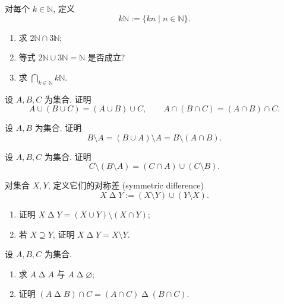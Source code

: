 \documentclass[usesamecnt, thmcnt=section, lang=cn, newtx, 10pt, scheme=chinese]{elegantbook}
\begin{document}
\begin{exercise}\label{ex:sets-02}
对每个 $k\in\mathbb N$, 定义
\[
 k\mathbb N:=\{kn\mid n\in\mathbb N\}.
\]
\begin{enumerate}[label=\rm(\arabic*)]
  \item 求 $2\mathbb N\cap3\mathbb N$;
  \item 等式 $2\mathbb N\cup3\mathbb N=\mathbb N$ 是否成立?
  \item 求 $\bigcap_{k\in\mathbb N}k\mathbb N$.
\end{enumerate}
\end{exercise}

\begin{exercise}\label{ex:sets-06}
设 $A,B,C$ 为集合. 证明
\[
 A\cup(B\cup C)=(A\cup B)\cup C,
 \qquad
 A\cap(B\cap C)=(A\cap B)\cap C.
\]
\end{exercise}

\begin{exercise}\label{ex:sets-09}
设 $A,B$ 为集合. 证明
\[
 B\setminus A=(B\cup A)\setminus A=B\setminus(A\cap B).
\]
\end{exercise}

\begin{exercise}\label{ex:sets-10}
设 $A,B,C$ 为集合. 证明
\[
 C\setminus(B\setminus A)=(C\cap A)\cup(C\setminus B).
\]
\end{exercise}

\begin{exercise}\label{ex:sets-11}
对集合 $X,Y$, 定义它们的{\color{blue}对称差 (symmetric difference)}
\[
 X\mathbin\Delta Y:=(X\setminus Y)\cup(Y\setminus X).
\]
\begin{enumerate}[label=\rm(\arabic*)]
  \item 证明 $X\mathbin\Delta Y=(X\cup Y)\setminus(X\cap Y)$;
  \item 若 $X\supseteq Y$, 证明 $X\mathbin\Delta Y=X\setminus Y$.
\end{enumerate}
\end{exercise}

\begin{exercise}\label{ex:sets-12}
设 $A,B,C$ 为集合.
\begin{enumerate}[label=\rm(\arabic*)]
  \item 求 $A\mathbin\Delta A$ 与 $A\mathbin\Delta\varnothing$;
  \item 证明 $(A\mathbin\Delta B)\cap C=(A\cap C)\mathbin\Delta(B\cap C)$.
\end{enumerate}
\end{exercise}
\end{document}

